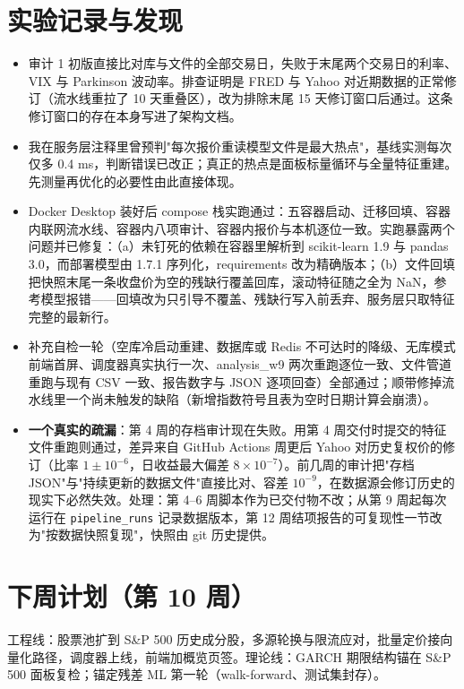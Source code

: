 \documentclass[11pt]{ctexart}
\begin{document}
\section{实验记录与发现}
\begin{itemize}
  \item 审计 1 初版直接比对库与文件的全部交易日，失败于末尾两个交易日的利率、VIX 与 Parkinson 波动率。排查证明是 FRED 与 Yahoo 对近期数据的正常修订（流水线重拉了 10 天重叠区），改为排除末尾 15 天修订窗口后通过。这条修订窗口的存在本身写进了架构文档。
  \item 我在服务层注释里曾预判"每次报价重读模型文件是最大热点"，基线实测每次仅多 0.4 ms，判断错误已改正；真正的热点是面板标量循环与全量特征重建。先测量再优化的必要性由此直接体现。
  \item Docker Desktop 装好后 compose 栈实跑通过：五容器启动、迁移回填、容器内联网流水线、容器内八项审计、容器内报价与本机逐位一致。实跑暴露两个问题并已修复：（a）未钉死的依赖在容器里解析到 scikit-learn 1.9 与 pandas 3.0，而部署模型由 1.7.1 序列化，requirements 改为精确版本；（b）文件回填把快照末尾一条收盘价为空的残缺行覆盖回库，滚动特征随之全为 NaN，参考模型报错——回填改为只引导不覆盖、残缺行写入前丢弃、服务层只取特征完整的最新行。
  \item 补充自检一轮（空库冷启动重建、数据库或 Redis 不可达时的降级、无库模式前端首屏、调度器真实执行一次、analysis\_w9 两次重跑逐位一致、文件管道重跑与现有 CSV 一致、报告数字与 JSON 逐项回查）全部通过；顺带修掉流水线里一个尚未触发的缺陷（新增指数符号且表为空时日期计算会崩溃）。
  \item \textbf{一个真实的疏漏}：第 4 周的存档审计现在失败。用第 4 周交付时提交的特征文件重跑则通过，差异来自 GitHub Actions 周更后 Yahoo 对历史复权价的修订（比率 $1\pm10^{-6}$，日收益最大偏差 $8\times10^{-7}$）。前几周的审计把"存档 JSON"与"持续更新的数据文件"直接比对、容差 $10^{-9}$，在数据源会修订历史的现实下必然失效。处理：第 4--6 周脚本作为已交付物不改；从第 9 周起每次运行在 \texttt{pipeline\_runs} 记录数据版本，第 12 周结项报告的可复现性一节改为"按数据快照复现"，快照由 git 历史提供。
\end{itemize}

\section{下周计划（第 10 周）}
工程线：股票池扩到 S\&P 500 历史成分股，多源轮换与限流应对，批量定价接向量化路径，调度器上线，前端加概览页签。理论线：GARCH 期限结构锚在 S\&P 500 面板复检；锚定残差 ML 第一轮（walk-forward、测试集封存）。
\end{document}
